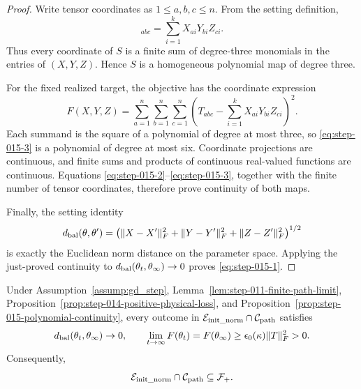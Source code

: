 \begin{proof}
Write tensor coordinates as
\(1\le a,b,c\le n\). From the setting definition,
\begin{equation}
  [S(X,Y,Z)]_{abc}
  =\sum_{i=1}^k X_{ai}Y_{bi}Z_{ci}.                     \label{eq:step-015-2}
\end{equation}
Thus every coordinate of \(S\) is a finite sum of degree-three monomials in
the entries of \((X,Y,Z)\). Hence \(S\) is a homogeneous polynomial map of
degree three.

For the fixed realized target, the objective has the coordinate expression
\begin{equation}
  F(X,Y,Z)
  =\sum_{a=1}^n\sum_{b=1}^n\sum_{c=1}^n
    \left(T_{abc}-\sum_{i=1}^kX_{ai}Y_{bi}Z_{ci}\right)^2. \label{eq:step-015-3}
\end{equation}
Each summand is the square of a polynomial of degree at most three, so \eqref{eq:step-015-3} is
a polynomial of degree at most six. Coordinate projections are continuous,
and finite sums and products of continuous real-valued functions are
continuous. Equations \eqref{eq:step-015-2}--\eqref{eq:step-015-3}, together with the finite number of tensor
coordinates, therefore prove continuity of both maps.

Finally, the setting identity
\[
  d_{\rm bal}(\theta,\theta')
  =\bigl(\|X-X'\|_F^2+\|Y-Y'\|_F^2+\|Z-Z'\|_F^2\bigr)^{1/2}
\]
is exactly the Euclidean norm distance on the parameter space. Applying the
just-proved continuity to
\(d_{\rm bal}(\theta_t,\theta_\infty)\to0\) proves \eqref{eq:step-015-1}.


\end{proof}


\begin{proposition}
\label{prop:step-015-event-inclusion}
\leavevmode\par\noindent
Under Assumption~\ref{assump:gd_step}, Lemma~\ref{lem:step-011-finite-path-limit}, Proposition~\ref{prop:step-014-positive-physical-loss}, and
Proposition~\ref{prop:step-015-polynomial-continuity}, every outcome in
\(\mathcal E_{\rm init\_norm}\cap\mathcal C_{\rm path}\) satisfies
\begin{equation}
  d_{\rm bal}(\theta_t,\theta_\infty)\to0,
  \qquad
  \lim_{t\to\infty}F(\theta_t)
  =F(\theta_\infty)
  \ge\epsilon_0(\kappa)\|T\|_F^2>0.                    \label{eq:step-015-4}
\end{equation}
Consequently,
\begin{equation}
  \mathcal E_{\rm init\_norm}\cap\mathcal C_{\rm path}
  \subseteq\mathcal F_+.                                \label{eq:step-015-5}
\end{equation}

\end{proposition}

